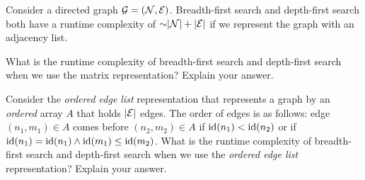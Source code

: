 


\maketitle
\DEFAULTMSG{}

\begin{problem}
Consider a directed graph $\mathcal{G} = (\mathcal{N}, \mathcal{E})$. Breadth-first search and depth-first search both have a runtime complexity of $\mathord{\sim}\lvert \mathcal{N} \rvert + \lvert \mathcal{E} \rvert$ if we represent the graph with an adjacency list.
\begin{questions}
\item What is the runtime complexity of breadth-first search and depth-first search when we use the matrix representation? Explain your answer.
\item Consider the \emph{ordered edge list} representation that represents a graph by an \emph{ordered} array $A$ that holds $\lvert \mathcal{E} \rvert$ edges. The order of edges is as follows: edge $(n_1, m_1) \in A$ comes before $(n_2, m_2) \in A$ if $\operatorname{id}(n_1) < \operatorname{id}(n_2)$ or if $\operatorname{id}(n_1) = \operatorname{id}(n_1) \land \operatorname{id}(m_1) \leq \operatorname{id}(m_2)$. What is the runtime complexity of breadth-first search and depth-first search when we use the \emph{ordered edge list} representation? Explain your answer.
\end{questions}
\end{problem}

